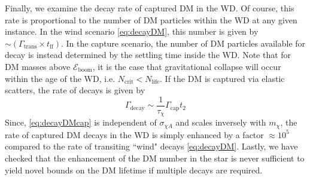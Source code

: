 \documentclass[preprintnumbers,amsmath,amssymb,prd,superscriptaddress]{revtex4}
\newcommand{\Eboom}{\mathcal{E}_\text{boom}}
\begin{document}
Finally, we examine the decay rate of captured DM in the WD. 
Of course, this rate is proportional to the number of DM particles within the WD at any given instance.  
In the wind scenario \eqref{eq:decayDM}, this number is given by $\sim (\Gamma_\text{trans} \times t_\text{ff})$.  
In the capture scenario, the number of DM particles available for decay is instead determined by the settling time inside the WD. 
Note that for DM masses above $\Eboom$, it is the case that gravitational collapse will occur within the age of the WD, i.e. $N_\text{crit} < N_\text{life}$. 
If the DM is captured via elastic scatters, the rate of decays is given by
\begin{equation}
\Gamma_\text{decay} \sim  \frac{1}{\tau_\chi} \Gamma_\text{cap} t_2
\label{eq:decayDMcap}
\end{equation}
Since, \eqref{eq:decayDMcap} is independent of $\sigma_{\chi A}$ and scales inversely with $m_\chi$, the rate of captured DM decays in the WD is simply enhanced by a factor $\approx 10^5$ compared to the rate of transiting ``wind" decays \eqref{eq:decayDM}.  
Lastly, we have checked that the enhancement of the DM number in the star is never sufficient to yield novel bounds on the DM lifetime if multiple decays are required.
\end{document}
